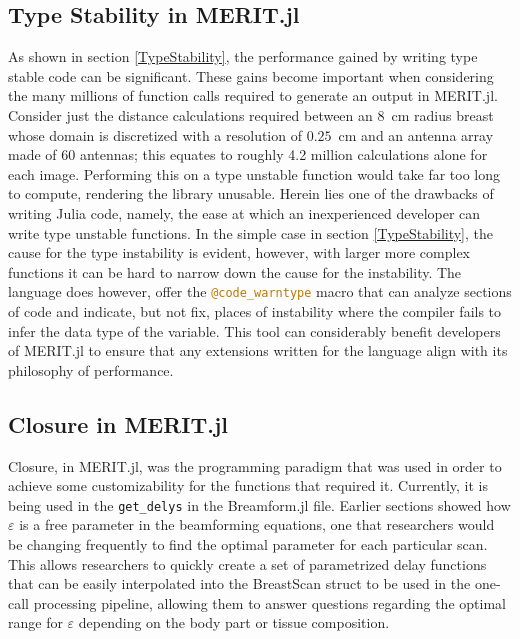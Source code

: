\subsection{Type Stability in MERIT.jl}
As shown in section \ref{TypeStability}, the performance gained by writing type stable code can be significant. These
gains become important when considering the many millions of function calls required to generate an output in MERIT.jl.
Consider just the distance calculations required between an $8$~cm radius breast whose domain is discretized with a
resolution of $0.25$~cm and an antenna array made of 60 antennas; this equates to roughly 4.2 million calculations alone
for each image. Performing this on a type unstable function would take far too long to compute, rendering the library
unusable. Herein lies one of the drawbacks of writing Julia code, namely, the ease at which an inexperienced developer
can write type unstable functions. In the simple case in section \ref{TypeStability}, the cause for the type instability
is evident, however, with larger more complex functions it can be hard to narrow down the cause for the instability. The
language does however, offer the \lstinline[language=Julia]{@code_warntype} macro that can analyze sections of code and
indicate, but not fix, places of instability where the compiler fails to infer the data type of the variable. This tool
can considerably benefit developers of MERIT.jl to ensure that any extensions written for the language align
with its philosophy of performance.

\subsection{Closure in MERIT.jl}
\label{ClosureMJL}
Closure, in MERIT.jl, was the programming paradigm that was used in order to achieve some customizability for the
functions that required it. Currently, it is being used in the \lstinline[language=Julia]{get_delys} in the Breamform.jl
file. Earlier sections showed how $\varepsilon$ is a free parameter in the beamforming equations, one that researchers
would be changing frequently to find the optimal parameter for each particular scan. This allows researchers to quickly
create a set of parametrized delay functions that can be easily interpolated into the BreastScan struct to be used in
the one-call processing pipeline, allowing them to answer questions regarding the optimal range for $\varepsilon$
depending on the body part or tissue composition.

